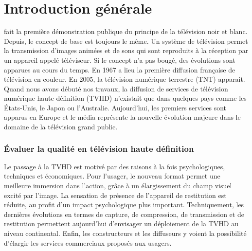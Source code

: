 
\chapter*{Introduction générale}
 fait la première démonstration publique du principe de la télévision noir et blanc. Depuis, le concept de base est toujours le même. Un système de télévision permet la transmission d'images animées et de sons qui sont reproduits à la réception par un appareil appelé téléviseur. Si le concept n'a pas bougé, des évolutions sont apparues au cours du temps. En 1967 a lieu la première diffusion française de télévision en couleur. En 2005, la télévision numérique terrestre (TNT) apparait. Quand nous avons débuté nos travaux, la diffusion de services de télévision numérique haute définition (TVHD) n'existait que dans quelques pays comme les États-Unis, le Japon ou l'Australie. Aujourd'hui, les premiers services sont apparus en Europe et le média représente la nouvelle évolution majeure dans le domaine de la télévision grand public.


\subsection*{Évaluer la qualité en télévision haute définition}
Le passage à la TVHD est motivé par des raisons à la fois psychologiques, techniques et économiques. Pour l'usager, le nouveau format permet une meilleure immersion dans l'action, grâce à un élargissement du champ visuel excité par l'image. La sensation de présence de l'appareil de restitution est réduite, au profit d'un impact psychologique plus important. Techniquement, les dernières évolutions en termes de capture, de compression, de transmission et de restitution permettent aujourd'hui d'envisager un déploiement de la TVHD au niveau continental. Enfin, les constructeurs et les diffuseurs y voient la possibilité d'élargir les services commerciaux proposés aux usagers.

